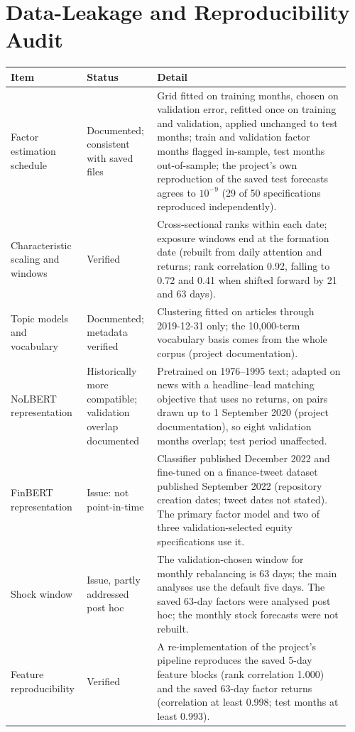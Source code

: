 \documentclass[11pt]{article}
\begin{document}
\appendix
\section{Data-Leakage and Reproducibility Audit}
\label{app:audit}

\small
\begin{longtable}{@{}p{0.2\linewidth}p{0.2\linewidth}p{0.55\linewidth}@{}}
\toprule
Item & Status & Detail \\
\midrule
\endhead
Factor estimation schedule & Documented; consistent with saved files & Grid fitted on training months, chosen on validation error, refitted once on training and validation, applied unchanged to test months; train and validation factor months flagged in-sample, test months out-of-sample; the project's own reproduction of the saved test forecasts agrees to $10^{-9}$ (29 of 50 specifications reproduced independently). \\ \midrule
Characteristic scaling and windows & Verified & Cross-sectional ranks within each date; exposure windows end at the formation date (rebuilt from daily attention and returns; rank correlation 0.92, falling to 0.72 and 0.41 when shifted forward by 21 and 63 days). \\ \midrule
Topic models and vocabulary & Documented; metadata verified & Clustering fitted on articles through 2019-12-31 only; the 10{,}000-term vocabulary basis comes from the whole corpus (project documentation). \\ \midrule
NoLBERT representation & Historically more compatible; validation overlap documented & Pretrained on 1976--1995 text; adapted on news with a headline--lead matching objective that uses no returns, on pairs drawn up to 1 September 2020 (project documentation), so eight validation months overlap; test period unaffected. \\ \midrule
FinBERT representation & Issue: not point-in-time & Classifier published December 2022 and fine-tuned on a finance-tweet dataset published September 2022 (repository creation dates; tweet dates not stated). The primary factor model and two of three validation-selected equity specifications use it. \\ \midrule
Shock window & Issue, partly addressed post hoc & The validation-chosen window for monthly rebalancing is 63 days; the main analyses use the default five days. The saved 63-day factors were analysed post hoc; the monthly stock forecasts were not rebuilt. \\ \midrule
Feature reproducibility & Verified & A re-implementation of the project's pipeline reproduces the saved 5-day feature blocks (rank correlation 1.000) and the saved 63-day factor returns (correlation at least 0.998; test months at least 0.993). \\ \midrule

\end{longtable}
\end{document}
